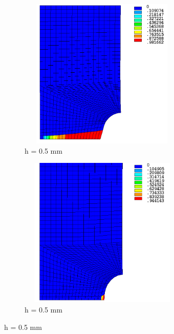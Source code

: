 \documentclass[12pt,a4paper,twoside,openright]{report}
\begin{document}
\begin{figure}[htbp!]\ContinuedFloat 
     \begin{subfigure}{0.4\textwidth}
         \includegraphics[width=8cm,height=7.2cm,keepaspectratio]{25.d1-0.5-r.png}
         \caption{h = 0.5 mm}
         \label{fig:d1-0.5-r}
     \end{subfigure}   
     \hspace{1.8cm}
     \begin{subfigure}{0.4\textwidth}
         \includegraphics[width=8cm,height=7.2cm,keepaspectratio]{25.d1-0.5-nr.png}
         \caption{h = 0.5 mm}
         \label{fig:d1-0.5-nr}
     \end{subfigure}
\end{figure}
\FloatBarrier
\end{document}
